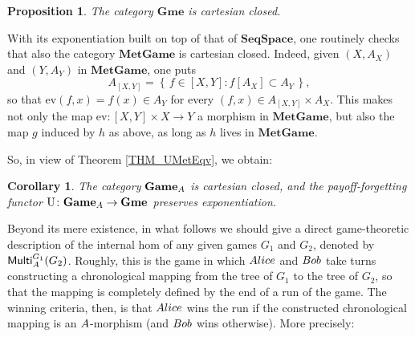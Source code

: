 \documentclass[12pt]{amsart}
\newtheorem{prop}[thm]{Proposition}
\newtheorem{cor}[thm]{Corollary}
\theoremstyle{definition}
\newcommand{\set}[1]{\left\{\, {#1} \,\right\}}
\newcommand{\ali}{\textup{\textmd{\textsc{Alice}}}}
\newcommand{\bob}{\textup{\textmd{\textsc{Bob}}}}
\newcommand{\A}{\textup{\textmd{\textsc{A}}}}
\newcommand{\MetGame}{\mathbf{MetGame}}
\newcommand{\Games}{\mathbf{Game}}
\newcommand{\Gmes}{\mathbf{Gme}}
\newcommand{\Multi}{\mathsf{Multi}}
\begin{document}
\begin{prop}
	The category $\Gmes$ is cartesian closed.
\end{prop}

With its exponentiation built on top of that of $\mathbf{SeqSpace}$, one routinely checks that also the category $\mathbf{MetGame}$ is cartesian closed. Indeed, given $(X,A_X)$ and $(Y,A_Y)$ in $\MetGame$, one puts
\[
A_{[X,Y]} = \set{f\in [X,Y]: f[A_X]\subset A_Y},
\]
so that $\mathrm{ev}(f,x)=f(x)\in A_Y$ for every $(f,x)\in A_{[X,Y]}\times A_X$. This makes not only the map $\mathrm{ev}\colon [X,Y]\times X\to Y$ a morphism in $\MetGame$, but also the map $g$ induced by $h$ as above, as long as $h$ lives in $\mathbf{MetGame}$.

So, in view of Theorem \ref{THM_UMetEqv}, we obtain:

\begin{cor}
	The category $\Games_\A$ is cartesian closed, and the payoff-forgetting functor $\mathrm{U}\colon \Games_{\A}\to \Gmes$ preserves exponentiation.
\end{cor}

Beyond its mere existence, in what follows we should give a direct game-theoretic description of the internal hom of any given games $G_1$ and $G_2$, denoted by $\Multi_\A^{G_1}(G_2)$. Roughly, this is the game in which $\ali$ and $\bob$ take turns constructing a chronological mapping from the tree of $G_1$ to the tree of $G_2$, so that the mapping is completely defined by the end of a run of the game. The winning criteria, then, is that $\ali$ wins the run if the constructed chronological mapping is an $\A$-morphism (and $\bob$ wins otherwise). More precisely:
\end{document}

